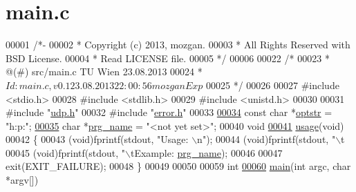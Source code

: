 \hypertarget{main_8c_source}{\section{main.\+c}
\label{main_8c_source}
}

\begin{DoxyCode}
00001 \textcolor{comment}{/*-}
00002 \textcolor{comment}{ * Copyright (c) 2013, mozgan.}
00003 \textcolor{comment}{ * All Rights Reserved with BSD License.}
00004 \textcolor{comment}{ * Read LICENSE file.}
00005 \textcolor{comment}{ */}
00006 
00022 \textcolor{comment}{/*}
00023 \textcolor{comment}{ *      @(#) src/main.c     TU Wien 23.08.2013}
00024 \textcolor{comment}{ *  $Id: main.c,v 0.1 23.08.2013 22:00:56 mozgan Exp $}
00025 \textcolor{comment}{ */}
00026 
00027 \textcolor{preprocessor}{#include <stdio.h>}
00028 \textcolor{preprocessor}{#include <stdlib.h>}
00029 \textcolor{preprocessor}{#include <unistd.h>}
00030 
00031 \textcolor{preprocessor}{#include "\hyperlink{udp_8h}{udp.h}"}
00032 \textcolor{preprocessor}{#include "\hyperlink{error_8h}{error.h}"}
00033 
\hypertarget{main_8c_source_l00034}{}\hyperlink{main_8c_adc0221a311d122f5c20b9ce7982f95ee}{00034} \textcolor{keyword}{const} \textcolor{keywordtype}{char}  *\hyperlink{main_8c_adc0221a311d122f5c20b9ce7982f95ee}{optstr} = \textcolor{stringliteral}{"h:p:"};                 
\hypertarget{main_8c_source_l00035}{}\hyperlink{main_8c_a8a8a6db7728221fbc910782969be77c2}{00035} \textcolor{keywordtype}{char}        *\hyperlink{main_8c_a8a8a6db7728221fbc910782969be77c2}{prg\_name} = \textcolor{stringliteral}{"<not yet set>"};    
00040 \textcolor{keywordtype}{void}
\hypertarget{main_8c_source_l00041}{}\hyperlink{main_8c_ae8605e2b78cd4a81b6c6b5c30cb7366a}{00041} \hyperlink{main_8c_ae8605e2b78cd4a81b6c6b5c30cb7366a}{usage}(\textcolor{keywordtype}{void})
00042 \{
00043         (void)fprintf(stdout, \textcolor{stringliteral}{"Usage: \(\backslash\)n"});
00044         (void)fprintf(stdout, \textcolor{stringliteral}{"\(\backslash\)t%
00045         (void)fprintf(stdout, \textcolor{stringliteral}{"\(\backslash\)tExample: %
      \hyperlink{main_8c_a8a8a6db7728221fbc910782969be77c2}{prg\_name});
00046 
00047         exit(EXIT\_FAILURE);
00048 \}
00049 
00050 
00059 \textcolor{keywordtype}{int}
\hypertarget{main_8c_source_l00060}{}\hyperlink{main_8c_a0ddf1224851353fc92bfbff6f499fa97}{00060} \hyperlink{main_8c_a0ddf1224851353fc92bfbff6f499fa97}{main}(\textcolor{keywordtype}{int} argc, \textcolor{keywordtype}{char} *argv[])
}}
\end{DoxyCode}
